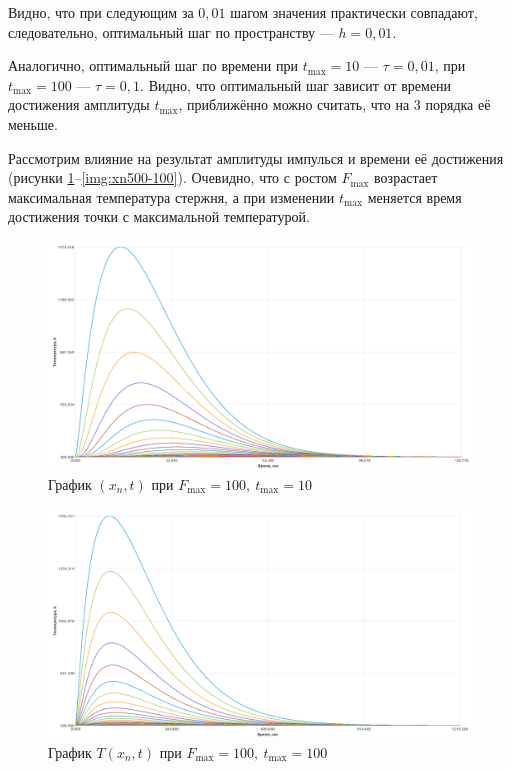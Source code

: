 \documentclass[a4paper,oneside,12pt]{extreport}
\begin{document}
\begin{enumerate}
	Видно, что при следующим за $0,01$ шагом значения практически совпадают, следовательно, оптимальный шаг по пространству — $h = 0,01$.

	Аналогично, оптимальный шаг по времени при $t_{\max} = 10$ — $\tau = 0,01$, при $t_{\max} = 100$ — $\tau = 0,1$.
	Видно, что оптимальный шаг зависит от времени достижения амплитуды $t_{\max}$, приближённо можно считать, что на 3 порядка её меньше.

	Рассмотрим влияние на результат амплитуды импулься и времени её достижения (рисунки \ref{img:xn100-10}–\ref{img:xn500-100}).
	Очевидно, что с ростом $F_{\max}$ возрастает максимальная температура стержня, а при изменении $t_{\max}$ меняется время достижения точки с максимальной температурой.

	\begin{figure}[H]
		\centering
		\includegraphics[width=0.75\linewidth]{inc/img/xn100-10.png}
		\caption{График $(x_n, t)$ при $F_{\max} = 100,\ t_{\max} = 10$}
		\label{img:xn100-10}
	\end{figure}

	\begin{figure}[H]
		\centering
		\includegraphics[width=0.75\linewidth]{inc/img/xn100-100.png}
		\caption{График $T(x_n, t)$ при $F_{\max} = 100,\ t_{\max} = 100$}
		\label{img:xn100-100}
	\end{figure}


\end{enumerate}
\end{document}
